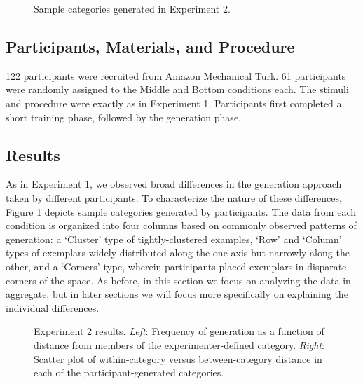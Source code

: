 \documentclass[12pt]{article}
\newcommand\inputpgf[2]{{
\let\pgfimageWithoutPath\pgfimage
\renewcommand{\pgfimage}[2][]{\pgfimageWithoutPath[##1]{#1/##2}}

}}
\begin{document}
\begin{flushleft}
\begin{figure}
    \begin{center}
    \inputpgf{figs/}{e2-samples.pgf}
    \caption{Sample categories generated in Experiment 2. }
    \label{fig:e2-samples}
    \end{center}
\end{figure}


\subsection{Participants, Materials, and Procedure}

122 participants were recruited from Amazon Mechanical Turk. 61 participants were randomly assigned to the Middle and Bottom conditions each. The stimuli and procedure were exactly as in Experiment 1. Participants first completed a short training phase, followed by the generation phase.


\subsection{Results}

As in Experiment 1, we observed broad differences in the generation approach taken by different participants.  To characterize the nature of these differences, Figure \ref{fig:e2-samples} depicts sample categories generated by participants. The data from each condition is organized into four columns based on commonly observed patterns of generation: a `Cluster' type of tightly-clustered examples,   `Row' and `Column' types of exemplars widely distributed along the one axis but narrowly along the other, and a `Corners' type, wherein participants placed exemplars in disparate corners of the space. As before, in this section we focus on analyzing the data in aggregate, but in later sections we will focus more specifically on explaining the individual differences.

\begin{figure}
    \begin{center}
    \inputpgf{figs/}{e2-distanceplots.pgf}
    \caption{Experiment 2 results. {\em Left}: Frequency of generation as a function of distance from members of the experimenter-defined category. {\em Right}: Scatter plot of within-category versus between-category distance in each of the participant-generated categories.}
    \label{fig:e2-distanceplots}
    \end{center}
\end{figure}


\end{flushleft}
\end{document}
